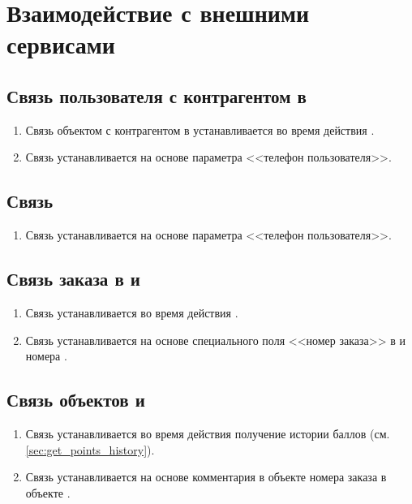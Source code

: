 \chapter{Взаимодействие с внешними сервисами}

    \section{Связь пользователя с контрагентом в }
        \begin{enumerate}
            \item Связь объектом  с контрагентом в  устанавливается во время действия .
            \item Связь устанавливается на основе параметра <<телефон пользователя>>.
        \end{enumerate}

    \section{Связь  }
        \begin{enumerate}
            \item Связь устанавливается на основе параметра <<телефон пользователя>>.
        \end{enumerate}

    \section{Связь заказа в  и }
        \begin{enumerate}
            \item Связь устанавливается во время действия .
            \item Связь устанавливается на основе специального поля <<номер заказа>> в  и номера .
        \end{enumerate}
    
    \section{Связь объектов  и }
        \begin{enumerate}
            \item Связь устанавливается во время действия получение истории баллов (см. \ref{sec:get_points_history}).
            \item Связь устанавливается на основе комментария в объекте  номера заказа в объекте .
        \end{enumerate}
    
